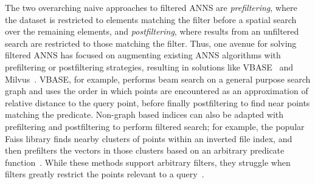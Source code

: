 \documentclass{article}
\newcommand{\myparagraph}[1]{\smallskip\noindent {\bf #1.}}
\theoremstyle{plain}
\theoremstyle{definition}
\theoremstyle{remark}
\newcommand{\julian}[1]{{\color{red}{\bf Julian:} #1}}
\begin{document}
\myparagraph{Filtered ANNS} 
\label{sec:prefiltering_and_postfiltering}
The two overarching naive approaches to filtered ANNS are \emph{prefiltering}, where the dataset is restricted to elements matching the filter before a spatial search over the remaining elements, and \emph{postfiltering}, where results from an unfiltered search are restricted to those matching the filter. Thus, one avenue for solving filtered ANNS has focused on augmenting existing ANNS algorithms with prefiltering or postfiltering strategies, resulting in solutions like VBASE~\cite{vbase} and Milvus~\cite{milvus2022hybridsearch}. VBASE, for example, performs beam search on a general purpose search graph and uses the order in which points are encountered as an approximation of relative distance to the query point, before finally postfiltering to find near points matching the predicate. Non-graph based indices can also be adapted with prefiltering and postfiltering to perform filtered search; for example, the popular Faiss library finds nearby clusters of points within an inverted file index, and then prefilters the vectors in those clusters based on an arbitrary predicate function~\cite{douze2024faiss}. 
While these methods support arbitrary filters, they struggle when filters greatly restrict the points relevant to a query~\cite{filtereddiskANN}. 
\end{document}
